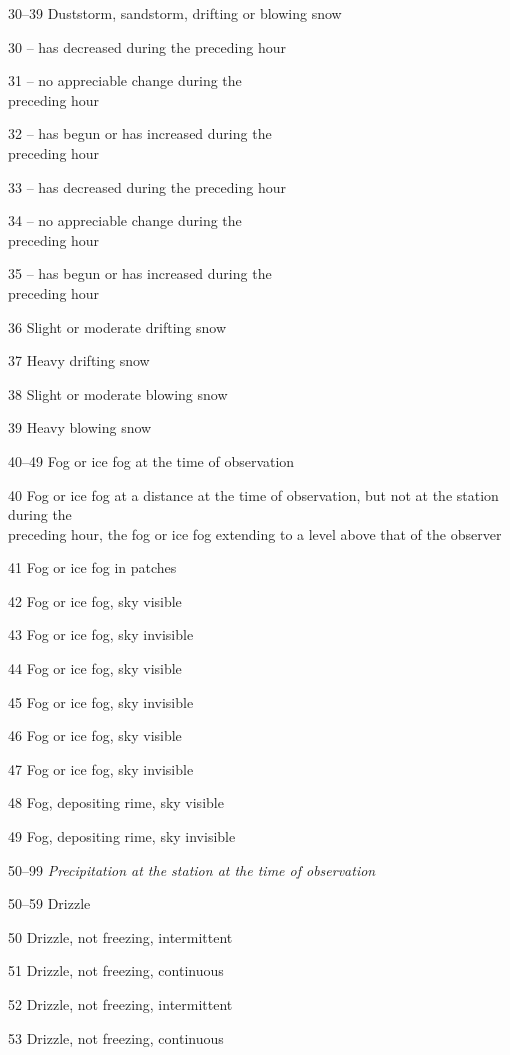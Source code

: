 30--39 Duststorm, sandstorm, drifting or blowing snow

30 -- has decreased during the preceding hour

31 -- no appreciable change during the\\
preceding hour

32 -- has begun or has increased during the\\
preceding hour

33 -- has decreased during the preceding hour

34 -- no appreciable change during the\\
preceding hour

35 -- has begun or has increased during the\\
preceding hour

36 Slight or moderate drifting snow

37 Heavy drifting snow

38 Slight or moderate blowing snow

39 Heavy blowing snow

40--49 Fog or ice fog at the time of observation

40 Fog or ice fog at a distance at the time of observation, but not at the station during the\\
preceding hour, the fog or ice fog extending to a level above that of the observer

41 Fog or ice fog in patches

42 Fog or ice fog, sky visible

43 Fog or ice fog, sky invisible

44 Fog or ice fog, sky visible

45 Fog or ice fog, sky invisible

46 Fog or ice fog, sky visible

47 Fog or ice fog, sky invisible

48 Fog, depositing rime, sky visible

49 Fog, depositing rime, sky invisible

50--99 \emph{Precipitation at the station at the time of observation}

50--59 Drizzle

50 Drizzle, not freezing, intermittent

51 Drizzle, not freezing, continuous

52 Drizzle, not freezing, intermittent

53 Drizzle, not freezing, continuous

